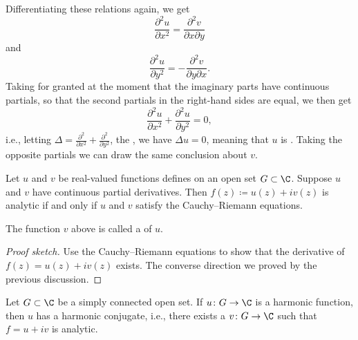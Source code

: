 Differentiating these relations again, we get
\[
	\frac{\partial^2 u}{\partial x^2} = \frac{\partial^2 v}{\partial x \partial y}
\]
and
\[
	\frac{\partial^2 u}{\partial y^2} = - \frac{\partial^2 v}{\partial y \partial x}.
\]
Taking for granted at the moment that the imaginary parts have continuous partials, so that the second partials in the right-hand sides are equal, we then get
\[
	\frac{\partial^2 u}{\partial x^2} + \frac{\partial^2 u}{\partial y^2} = 0,
\]
i.e., letting $\Delta = \frac{\partial^2}{\partial x^2} + \frac{\partial^2}{\partial y^2}$, the , we have $\Delta u = 0$, meaning that $u$ is .
Taking the opposite partials we can draw the same conclusion about $v$.

\begin{theorem}
	Let $u$ and $v$ be real-valued functions defines on an open set $G \subset \C$.
	Suppose $u$ and $v$ have continuous partial derivatives.
	Then $f(z) \coloneqq u(z) + i v(z)$ is analytic if and only if $u$ and $v$ satisfy the Cauchy--Riemann equations.
\end{theorem}

\begin{remark}
	The function $v$ above is called a  of $u$.
\end{remark}

\begin{proof}[Proof sketch]
	Use the Cauchy--Riemann equations to show that the derivative of $f(z) = u(z) + i v(z)$ exists.
	The converse direction we proved by the previous discussion.
\end{proof}

\begin{theorem}
	Let $G \subset \C$ be a simply connected open set.
	If $u \colon G \to \C$ is a harmonic function, then $u$ has a harmonic conjugate, i.e., there exists a $v \colon G \to \C$ such that $f = u + i v$ is analytic.
\end{theorem}

